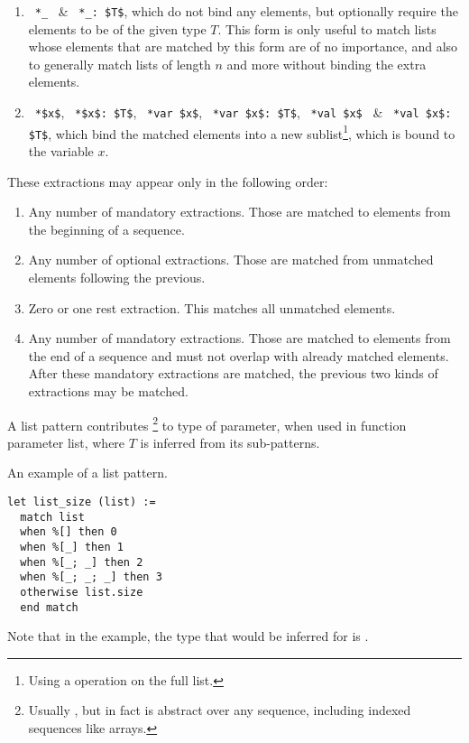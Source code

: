 \begin{enumerate}
\begin{enumerate}
      \item ~\lstinline!*_!~ \& ~\lstinline!*_: $T$!, which do not bind any elements, but optionally require the elements to be of the given type $T$. This form is only useful to match lists whose elements that are matched by this form are of no importance, and also to generally match lists of length $n$ and more without binding the extra elements. 
      \item ~\lstinline!*$x$!, ~\lstinline!*$x$: $T$!, ~\lstinline!*var $x$!, ~\lstinline!*var $x$: $T$!, ~\lstinline!*val $x$!~ \& ~\lstinline!*val $x$: $T$!, which bind the matched elements into a new sublist\footnote{Using a  operation on the full list.}, which is bound to the variable $x$. 
    \end{enumerate}
\end{enumerate}

These extractions may appear only in the following order:
\begin{enumerate}
  \item Any number of mandatory extractions. Those are matched to elements from the beginning of a sequence. 
  \item Any number of optional extractions. Those are matched from unmatched elements following the previous. 
  \item Zero or one rest extraction. This matches all unmatched elements. 
  \item Any number of mandatory extractions. Those are matched to elements from the end of a sequence and must not overlap with already matched elements. After these mandatory extractions are matched, the previous two kinds of extractions may be matched. 
\end{enumerate}

A list pattern contributes \footnote{Usually , but in fact is abstract over any sequence, including indexed sequences like arrays.} to type of parameter, when used in function parameter list, where $T$ is inferred from its sub-patterns. 

\example An example of a list pattern.
\begin{lstlisting}
let list_size (list) := 
  match list 
  when %[] then 0
  when %[_] then 1
  when %[_; _] then 2
  when %[_; _; _] then 3
  otherwise list.size
  end match
\end{lstlisting}
Note that in the example, the type that would be inferred for  is . 





